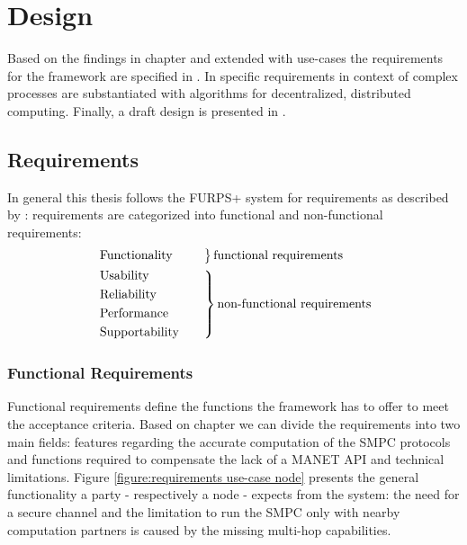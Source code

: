 
\FloatBarrier

\chapter{Design} \label{Design}


Based on the findings in chapter  and extended with use-cases the requirements for the framework are specified in . In  specific requirements in context of complex processes are substantiated with algorithms for decentralized, distributed computing. Finally, a draft design is presented in .

\section{Requirements} \label{Requirements}

In general this thesis follows the FURPS+ system for requirements as described by \textcite{Online:FURPS}: 
requirements are categorized into functional and non-functional requirements:
\begin{alignat*}{1}
& \begin{rcases*}
\mathmakebox[\widthof{\text{Supportability}}][l]{\text{Functionality}} & \quad
\end{rcases*} \mathmakebox[\widthof{\text{non-functional requirements}}][l]{\text{functional requirements}} \\
& \begin{rcases*}
\text{Usability} & \quad \\
\text{Reliability} & \quad \\
\text{Performance} & \quad \\
\text{Supportability} & \quad
\end{rcases*} \text{non-functional requirements}
\end{alignat*}

\subsection{Functional Requirements} \label{Functional Requirements}

Functional requirements define the functions the framework has to offer to meet the acceptance criteria. Based on chapter  we can divide the requirements into two main fields: features regarding the accurate computation of the \gls{SMPC} protocols and functions required to compensate the lack of a \gls{MANET} \gls{API} and technical limitations.
Figure \ref{figure:requirements use-case node} presents the general functionality a party - respectively a node - expects from the system: the need for a secure channel and the limitation to run the \gls{SMPC} only with nearby computation partners is caused by the missing multi-hop capabilities.

